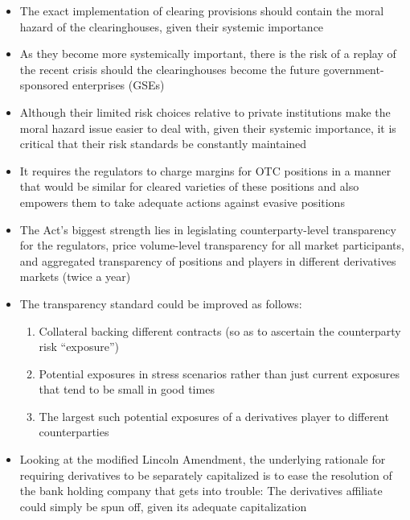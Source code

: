 \documentclass[11pt]{beamer}
\begin{document}
\begin{frame}
\begin{itemize}
\item The exact implementation of clearing provisions should contain the moral hazard of the clearinghouses, given their systemic importance
\item As they become more systemically important, there is the risk of a replay of the recent crisis should the clearinghouses become the future government-sponsored enterprises (GSEs)
\item Although their limited risk choices relative to private institutions make the moral hazard issue easier to deal with, given their systemic importance, it is critical that their risk standards be constantly maintained
\item It requires the regulators to charge margins for OTC positions in a manner that would be similar for cleared varieties of these positions and also empowers them to take adequate actions against evasive positions
\item The Act’s biggest strength lies in legislating counterparty-level transparency for the regulators, price volume-level transparency for all market participants, and aggregated transparency of positions and players in different derivatives markets (twice a year)
\end{itemize}
\end{frame}

\begin{frame}
\begin{itemize}
\item The transparency standard could be improved as follows:
\begin{enumerate}
\item Collateral backing different contracts (so as to ascertain the counterparty risk “exposure”)
\item Potential exposures in stress scenarios rather than just current exposures that tend to be small in good times
\item The largest such potential exposures of a derivatives player to different counterparties
\end{enumerate}
\item Looking at the modified Lincoln Amendment, the underlying rationale for requiring derivatives to be separately capitalized is to ease the resolution of the bank holding company that gets into trouble: The derivatives affiliate could simply be spun off, given its adequate capitalization
\end{itemize}
\end{frame}
\end{document}
